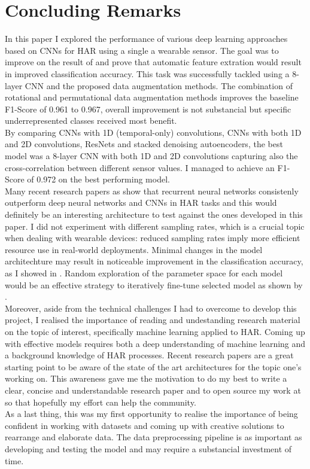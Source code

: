
\section{Concluding Remarks}
\label{sec:conclusions}
In this paper I explored the performance of various deep learning approaches based on CNNs for HAR using a single a wearable sensor. The goal was to improve on the result of \cite{base-paper} and prove that automatic feature extration would result in improved classification accuracy. This task was successfully tackled using a 8-layer CNN and the proposed data augmentation methods. The combination of rotational and permutational data augmentation methods improves the baseline \mbox{F1-Score} of 0.961 to 0.967, overall improvement is not substancial but specific underrepresented classes received most benefit.\\
By comparing CNNs with 1D (temporal-only) convolutions, CNNs with both 1D and 2D convolutions, ResNets and stacked denoising autoencoders, the best model was a 8-layer CNN with both 1D and 2D convolutions capturing also the cross-correlation between different sensor values. I managed to achieve an \mbox{F1-Score} of 0.972 on the best performing model.\\
Many recent research papers as \cite{nils-2016, Valarezo-2017, su-2016} show that recurrent neural networks consistenly outperform deep neural networks and CNNs in HAR tasks and this would definitely be an interesting architecture to test against the ones developed in this paper. I did not experiment with different sampling rates, which is a crucial topic when dealing with wearable devices: reduced sampling rates imply more efficient resource use in \mbox{real-world} deployments. Minimal changes in the model architechture may result in noticeable improvement in the classification accuracy, as I showed in . Random exploration of the parameter space for each model would be an effective strategy to iteratively \mbox{fine-tune} selected model as shown by \cite{nils-2016}.\\
Moreover, aside from the technical challenges I had to overcome to develop this project, I realised the importance of reading and undestanding research material on the topic of interest, specifically machine learning applied to HAR. Coming up with effective models requires both a deep understanding of machine learning and a background knowledge of HAR processes. Recent research papers are a great starting point to be aware of the state of the art architectures for the topic one's working on. This awareness gave me the motivation to do my best to write a clear, concise and understandable research paper and to open source my work at  so that hopefully my effort can help the community.\\
As a last thing, this was my first opportunity to realise the importance of being confident in working with datasets and coming up with creative solutions to rearrange and elaborate data. The data preprocessing pipeline is as important as developing and testing the model and may require a substancial investment of time.
